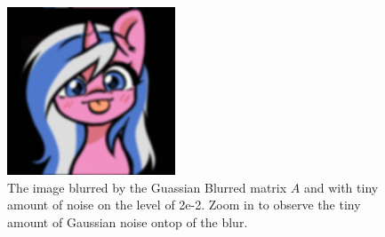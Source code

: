 \documentclass[]{article}
\theoremstyle{definition}
\begin{document}
        \begin{figure}[H]
            \centering
            \includegraphics*[width=5cm]{blurred_img.jpg}
            \caption{The image blurred by the Guassian Blurred matrix $A$ and with tiny amount of noise on the level of 2e-2. Zoom in to observe the tiny amount of Gaussian noise ontop of the blur.}
            \label{fig:blurred_alto}
        \end{figure}
\end{document}
